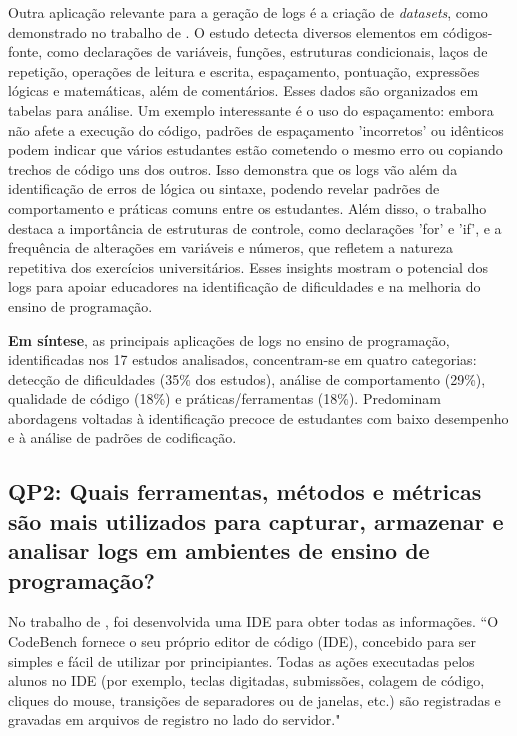Outra aplicação relevante para a geração de logs é a criação de \textit{datasets}, como demonstrado no trabalho de \cite{umezawa2020analysis}. O estudo detecta diversos elementos em códigos-fonte, como declarações de variáveis, funções, estruturas condicionais, laços de repetição, operações de leitura e escrita, espaçamento, pontuação, expressões lógicas e matemáticas, além de comentários. Esses dados são organizados em tabelas para análise. Um exemplo interessante é o uso do espaçamento: embora não afete a execução do código, padrões de espaçamento 'incorretos' ou idênticos podem indicar que vários estudantes estão cometendo o mesmo erro ou copiando trechos de código uns dos outros. Isso demonstra que os logs vão além da identificação de erros de lógica ou sintaxe, podendo revelar padrões de comportamento e práticas comuns entre os estudantes. Além disso, o trabalho destaca a importância de estruturas de controle, como declarações 'for' e 'if', e a frequência de alterações em variáveis e números, que refletem a natureza repetitiva dos exercícios universitários. Esses insights mostram o potencial dos logs para apoiar educadores na identificação de dificuldades e na melhoria do ensino de programação.

\noindent \textbf{Em síntese}, as principais aplicações de logs no ensino de programação, identificadas nos 17 estudos analisados, concentram-se em quatro categorias: detecção de dificuldades (35\% dos estudos), análise de comportamento (29\%), qualidade de código (18\%) e práticas/ferramentas (18\%). Predominam abordagens voltadas à identificação precoce de estudantes com baixo desempenho e à análise de padrões de codificação.

\subsection{QP2: Quais ferramentas, métodos e métricas são mais utilizados para capturar, armazenar e analisar logs em ambientes de ensino de programação?}\label{subsec:respostas-qp2}

No trabalho de \cite{pereira2020using}, foi desenvolvida uma IDE para obter todas as informações. ``O CodeBench fornece o seu próprio editor de código (IDE), concebido para ser simples e fácil de utilizar por principiantes. Todas as ações executadas pelos alunos no IDE (por exemplo, teclas digitadas, submissões, colagem de código, cliques do mouse, transições de separadores ou de janelas, etc.) são registradas e gravadas em arquivos de registro no lado do servidor."

